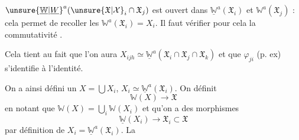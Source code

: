 $\unsure{\underline{\mathbb W}|\underline W}^a(\unsure{\mathfrak X|\mathcal X}_i\cap\mathfrak X_j)$ est   ouvert   dans $\underline{\mathbb W}^a(\mathfrak X_i)$ et  $\mathbb W^a(\mathfrak X_j)$ : cela permet de recoller les $\mathbb W^a(\mathfrak X_i)=X_i$. Il faut vérifier pour cela la  commutativité .

Cela tient au fait que l'on aura $X_{ijh}\simeq\underline{\mathbb W}^a(\mathfrak X_i\cap\mathfrak X_j\cap\mathfrak X_k)$ et que   $\varphi_{ji}$ (p. ex) s'identifie à l'identité.

On a ainsi défini un $X=\bigcup X_i$, $X_i\simeq\underline{\mathbb W}^a(\mathfrak X_i)$. On définit
\[
 \mathbb W(X)\longrightarrow\mathfrak X
\]
en notant que $\mathbb W(X)=\bigcup_i\mathbb W(X_i)$  et qu'on a des  morphismes
\[
 \underline{\mathbb W}(X_i)\longrightarrow\mathfrak X_i\subset\mathfrak X
\]
par définition de $X_i=\underline{\mathbb W}^a(\mathfrak X_i)$. La
